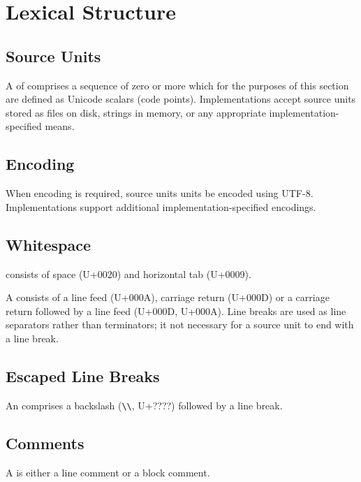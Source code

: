 \chapter{Lexical Structure}

\section{Source Units}

A  of comprises a sequence of zero or more  which for the purposes of this section are defined as Unicode scalars (code points).
Implementations \may accept source units stored as files on disk, strings in memory, or any appropriate implementation-specified means.

\section{Encoding}

When encoding is required, source units units \should be encoded using UTF-8.
Implementations \may support additional implementation-specified encodings.

\section{Whitespace}

 consists of space (U+0020) and horizontal tab (U+0009).

A  consists of a line feed (U+000A), carriage return (U+000D) or a carriage return followed by a line feed (U+000D, U+000A).
Line breaks are used as line separators rather than terminators; it not necessary for a source unit to end with a line break.

\section{Escaped Line Breaks}

An  comprises a backslash (\lstinline|\\|, U+????) followed by a line break.

\section{Comments}

A  is either a line comment or a block comment.

